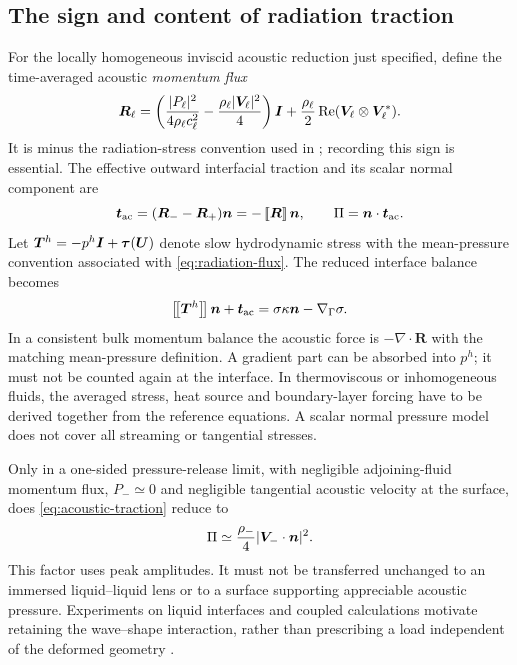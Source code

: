 \subsection{The sign and content of radiation traction}
For the locally homogeneous inviscid acoustic reduction just specified, define
the time-averaged acoustic \emph{momentum flux}
\begin{equation}
 \bm R_\ell=
 \left(\frac{|P_\ell|^2}{4\rho_\ell c_\ell^2}
            -\frac{\rho_\ell|\bm V_\ell|^2}{4}\right)\bm I
 +\frac{\rho_\ell}{2}\operatorname{Re}(\bm V_\ell\otimes\bm V_\ell^*).
 \label{eq:radiation-flux}
\end{equation}
It is minus the radiation-stress convention used in
\cite{chesneau2022}; recording this sign is essential. The effective outward
interfacial traction and its scalar normal component are
\begin{equation}
 \bm t_{\rm ac}=(\bm R_- -\bm R_+)\bm n=-\left[\!\left[\bm R\right]\!\right]\bm n,
 \qquad \Pi=\bm n\cdot\bm t_{\rm ac}.
 \label{eq:acoustic-traction}
\end{equation}
Let $\bm T^h=-p^h\bm I+\bm\tau(\bm U)$ denote slow hydrodynamic stress with the
mean-pressure convention associated with \cref{eq:radiation-flux}. The reduced
interface balance becomes
\begin{equation}
 \left[\!\left[\bm T^h\right]\!\right]\bm n+\bm t_{\rm ac}
       =\sigma\kappa\bm n-\nabla_\Gamma\sigma.
 \label{eq:averaged-jump}
\end{equation}
In a consistent bulk momentum balance the acoustic force is
$-\nabla\cdot\bm R$ with the matching mean-pressure definition. A gradient
part can be absorbed into $p^h$; it must not be counted again at the interface.
In thermoviscous or inhomogeneous fluids, the averaged stress, heat source and
boundary-layer forcing have to be derived together from the reference
equations. A scalar normal pressure model does not cover all streaming or
tangential stresses.

Only in a one-sided pressure-release limit, with negligible adjoining-fluid
momentum flux, $P_-\simeq0$ and negligible tangential acoustic velocity at the
surface, does \cref{eq:acoustic-traction} reduce to
\begin{equation}
 \Pi\simeq\frac{\rho_-}{4}|\bm V_-\cdot\bm n|^2.
 \label{eq:pressure-release-limit}
\end{equation}
This factor uses peak amplitudes. It must not be transferred unchanged to an
immersed liquid--liquid lens or to a surface supporting appreciable acoustic
pressure. Experiments on liquid interfaces and coupled calculations motivate
retaining the wave--shape interaction, rather than prescribing a load
independent of the deformed geometry \cite{bertin2012,chesneau2022,sisombat2023}.

